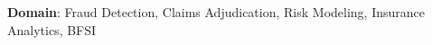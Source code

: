 \item \textbf{Domain}: Fraud Detection, Claims Adjudication, Risk Modeling, Insurance Analytics, BFSI
